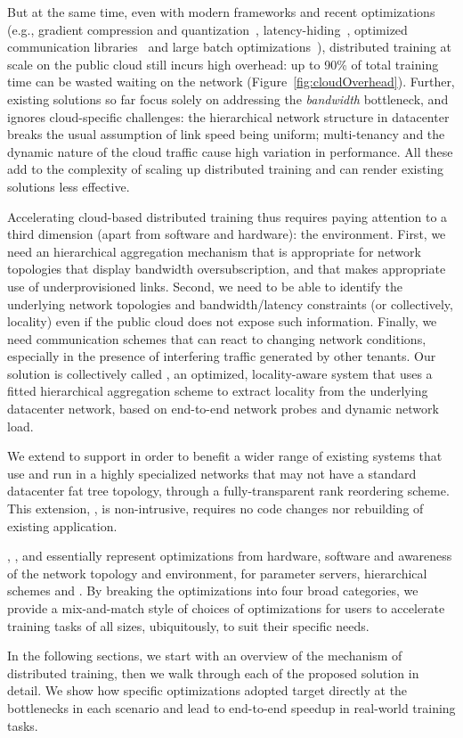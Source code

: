 But at the same time, even with modern frameworks and recent optimizations 
(e.g., gradient compression and quantization~\cite{lin2017deep, cntk1bt, lim20183lc}, latency-hiding~\cite{poseidon, jayarajan2019priority,hashemi2018tictac}, optimized communication libraries~\cite{facebook35:online, Operatio73:online, dmlcpsli50:online} and large batch optimizations~\cite{ImageNetIn1Hour}), distributed training at scale on the public cloud still incurs high overhead: up to 90\% of total training time can be wasted waiting on the network (Figure~\ref{fig:cloudOverhead}). Further, existing solutions so far focus solely on addressing the \textit{bandwidth} bottleneck, and ignores cloud-specific challenges: the hierarchical network structure in datacenter breaks the usual assumption of link speed being uniform; multi-tenancy and the dynamic nature of the cloud traffic cause high variation in performance. All these add to the complexity of scaling up distributed training and can render existing solutions less effective. 

Accelerating cloud-based distributed training thus requires paying attention to a third dimension (apart from software and hardware): the environment. First, we need an hierarchical aggregation mechanism that is appropriate for network topologies that display bandwidth oversubscription, and that makes appropriate use of underprovisioned links.  Second, we need to be able to identify the underlying network topologies and bandwidth/latency constraints (or collectively, locality) even if the public cloud does not expose such information.  Finally, we need communication schemes that can react to changing network conditions, especially in the presence of interfering traffic generated by other tenants. Our solution is collectively called \plink, an optimized, locality-aware system that uses a fitted hierarchical aggregation scheme to extract locality from the underlying datacenter network, based on end-to-end network probes and dynamic network load. 

We extend \plink to support \collectives in order to benefit a wider range of existing systems that use \collectives and run in a highly specialized networks that may not have a standard datacenter fat tree topology, through a fully-transparent rank reordering scheme. This extension, \cmpi, is non-intrusive, requires no code changes nor rebuilding of existing application.

\pbox, \phub, \plink and \cmpi essentially represent optimizations from hardware, software and awareness of the network topology and environment, for parameter servers, hierarchical schemes and \collectives. By breaking the optimizations into four broad categories, we provide a mix-and-match style of choices of optimizations for users to accelerate training tasks of all sizes, ubiquitously, to suit their specific needs. 

In the following sections, we start with an overview of the mechanism of distributed training, then we walk through each of the proposed solution in detail. We show how specific optimizations adopted target directly at the bottlenecks in each scenario and lead to end-to-end speedup in real-world training tasks.